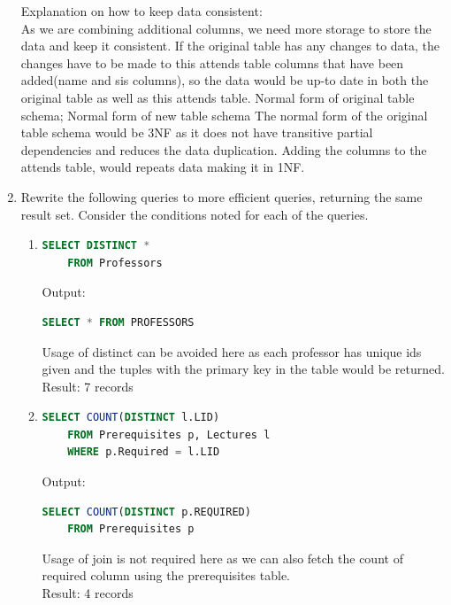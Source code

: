 \begin{enumerate}
Explanation on how to keep data consistent:\\
As we are combining additional columns, we need more storage to store the data and 	keep it consistent. If the original table has any changes to data, the changes have to 		be made to this attends table columns that have been added(name and sis columns), 		so the data would be up-to date in both the original table as well as this attends 		table.
Normal form of original table schema; Normal form of new table schema
The normal form of the original table schema would be 3NF as it does not have transitive partial dependencies and reduces the data duplication. Adding the columns to the attends table, would repeats data making it in 1NF.

\newpage
\item
  Rewrite the following queries to more efficient queries, returning the same result set.
  Consider the conditions noted for each of the queries.

  \begin{enumerate}
  \item

    \begin{lstlisting}[language=sql]
    SELECT DISTINCT *
    FROM Professors
    \end{lstlisting}

    Output: 
    \begin{lstlisting}[language=sql]
    SELECT * FROM PROFESSORS
    \end{lstlisting}
    Usage of distinct can be avoided here as each professor has unique ids given and the tuples with the primary key in the table would be returned.\\ 
    Result: 7 records

  \item
    \begin{lstlisting}[language=sql]
    SELECT COUNT(DISTINCT l.LID)
    FROM Prerequisites p, Lectures l
    WHERE p.Required = l.LID
    \end{lstlisting}

    Output:
    \begin{lstlisting}[language=sql] 
    SELECT COUNT(DISTINCT p.REQUIRED)
    FROM Prerequisites p
    \end{lstlisting}
    Usage of join is not required here as we can also fetch the count of required column using the prerequisites table.\\

    Result: 4 records



\end{enumerate}
\end{enumerate}
